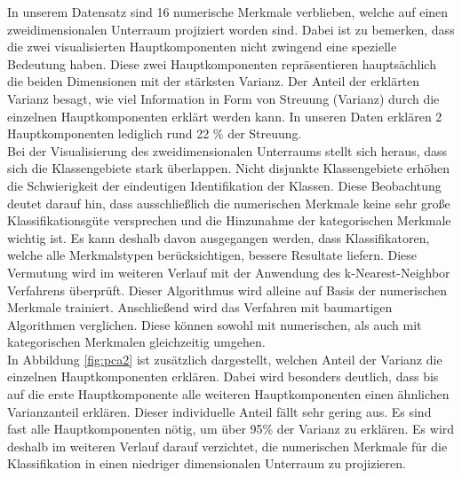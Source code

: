 In unserem Datensatz sind 16 numerische Merkmale verblieben, welche auf einen zweidimensionalen Unterraum projiziert worden sind. Dabei ist zu bemerken, dass die zwei visualisierten Hauptkomponenten nicht zwingend eine spezielle Bedeutung haben. Diese zwei Hauptkomponenten repräsentieren hauptsächlich die beiden Dimensionen mit der stärksten Varianz. Der Anteil der erklärten Varianz besagt, wie viel Information in Form von Streuung (Varianz) durch die einzelnen Hauptkomponenten erklärt werden kann. In unseren Daten erklären 2 Hauptkomponenten lediglich rund 22 \% der Streuung. \\

Bei der Visualisierung des zweidimensionalen Unterraums stellt sich heraus, dass sich die Klassengebiete stark überlappen. Nicht disjunkte Klassengebiete erhöhen die Schwierigkeit der eindeutigen Identifikation der Klassen.  Diese Beobachtung deutet darauf hin, dass ausschließlich die numerischen Merkmale keine sehr große Klassifikationsgüte versprechen und die Hinzunahme der kategorischen Merkmale wichtig ist. Es kann deshalb davon ausgegangen werden, dass Klassifikatoren, welche alle Merkmalstypen berücksichtigen, bessere Resultate liefern. Diese Vermutung wird im weiteren Verlauf mit der Anwendung des k-Nearest-Neighbor Verfahrens überprüft. Dieser Algorithmus wird alleine auf Basis der numerischen Merkmale trainiert. Anschließend wird das Verfahren mit baumartigen Algorithmen verglichen. Diese können sowohl mit numerischen, als auch mit kategorischen Merkmalen gleichzeitig umgehen.\\

In Abbildung \ref{fig:pca2} ist zusätzlich dargestellt, welchen Anteil der Varianz die einzelnen Hauptkomponenten erklären. Dabei wird besonders deutlich, dass bis auf die erste Hauptkomponente alle weiteren Hauptkomponenten einen ähnlichen Varianzanteil erklären. Dieser individuelle Anteil fällt sehr gering aus. Es sind fast alle Hauptkomponenten nötig, um über 95\% der Varianz zu erklären. Es wird deshalb im weiteren Verlauf darauf verzichtet, die numerischen Merkmale für die Klassifikation in einen niedriger dimensionalen Unterraum zu projizieren.\\

